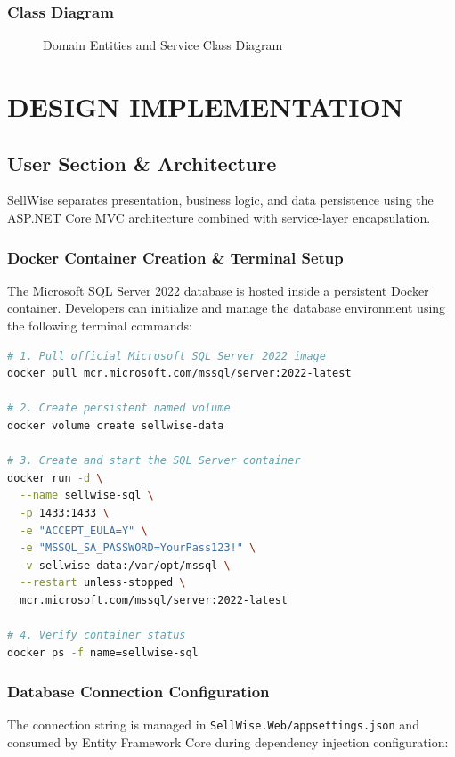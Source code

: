 \documentclass[12pt,a4paper]{report}
\begin{document}
\subsection{Class Diagram}
\begin{figure}[H]
    \centering
    
    \caption{Domain Entities and Service Class Diagram}
\end{figure}

\chapter{DESIGN IMPLEMENTATION}

\section{User Section \& Architecture}
SellWise separates presentation, business logic, and data persistence using the ASP.NET Core MVC architecture combined with service-layer encapsulation.

\subsection{Docker Container Creation \& Terminal Setup}
The Microsoft SQL Server 2022 database is hosted inside a persistent Docker container. Developers can initialize and manage the database environment using the following terminal commands:

\begin{lstlisting}[language=bash]
# 1. Pull official Microsoft SQL Server 2022 image
docker pull mcr.microsoft.com/mssql/server:2022-latest

# 2. Create persistent named volume
docker volume create sellwise-data

# 3. Create and start the SQL Server container
docker run -d \
  --name sellwise-sql \
  -p 1433:1433 \
  -e "ACCEPT_EULA=Y" \
  -e "MSSQL_SA_PASSWORD=YourPass123!" \
  -v sellwise-data:/var/opt/mssql \
  --restart unless-stopped \
  mcr.microsoft.com/mssql/server:2022-latest

# 4. Verify container status
docker ps -f name=sellwise-sql
\end{lstlisting}

\subsection{Database Connection Configuration}
The connection string is managed in \texttt{SellWise.Web/appsettings.json} and consumed by Entity Framework Core during dependency injection configuration:
\end{document}

